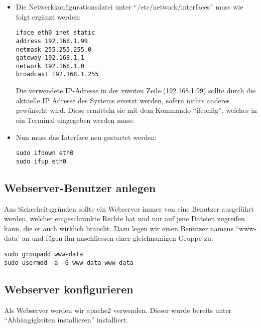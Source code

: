 \begin{itemize}
  \item Die Netwerkkonfigurationsdatei unter ``/etc/network/interfaces'' muss wie folgt ergänzt werden:
    \begin{lstlisting}
iface eth0 inet static
address 192.168.1.99
netmask 255.255.255.0
gateway 192.168.1.1
network 192.168.1.0
broadcast 192.168.1.255
    \end{lstlisting}
    Die verwendete IP-Adresse in der zweiten Zeile (192.168.1.99) sollte durch die aktuelle IP Adresse des Systems ersetzt werden, sofern nichts anderes gewünscht wird. Diese ermitteln sie mit dem Kommando ``ifconfig'', welches in ein Terminal eingegeben werden muss:
  \item Nun muss das Interface neu gestartet werden:
    \begin{lstlisting}
sudo ifdown eth0
sudo ifup eth0
    \end{lstlisting}
\end{itemize}

\subsection{Webserver-Benutzer anlegen}
Aus Sicherheitsgründen sollte ein Webserver immer von eine Benutzer ausgeführt werden, welcher eingeschränkte Rechte hat und nur auf jene Dateien zugreifen kann, die er auch wirklich braucht. Dazu legen wir einen Benutzer namens ``www-data' an und fügen ihn anschliessen einer gleichnamigen Gruppe zu:

\begin{lstlisting}
sudo groupadd www-data
sudo usermod -a -G www-data www-data
\end{lstlisting}

\subsection{Webserver konfigurieren}
Als Webserver werden wir apache2 verwenden. Dieser wurde bereits unter ``Abhängigkeiten installieren'' installiert.

